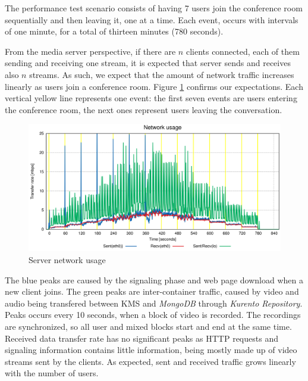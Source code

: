 \documentclass[10pt,conference]{IEEEtran}
\begin{document}
The performance test scenario consists of having 7 users join the conference room sequentially and then leaving it, one at a time.
Each event, occurs with intervals of one minute, for a total of thirteen minutes (780 seconds).
  
From the media server perspective, if there are $n$ clients connected, each of them sending and receiving one stream, it is expected that server sends and receives also $n$ streams.
As such, we expect that the amount of network traffic increases linearly as users join a conference room.
Figure \ref{fig:test_full_features_net} confirms our expectations.
Each vertical yellow line represents one event: the first seven events are users entering the conference room, the next ones represent users leaving the conversation. 
     

\begin{figure}
  \centering
\includegraphics[width=\linewidth]{net_usage.png}
  \caption{Server network usage}
  \label{fig:test_full_features_net}
\end{figure}


The blue peaks are caused by the signaling phase and web page download when a new client joins.
The green peaks are inter-container traffic, caused by video and audio being transfered between \gls{KMS} and \emph{MongoDB} through \emph{Kurento Repository}.
Peaks occurs every 10 seconds, when a block of video is recorded.
The recordings are synchronized, so all user and mixed blocks start and end at the same time.
Received data transfer rate has no significant peaks as \gls{HTTP} requests and signaling information contains little information, being mostly made up of video streams sent by the clients. %
As expected, sent and received traffic grows linearly with the number of users.
\end{document}
